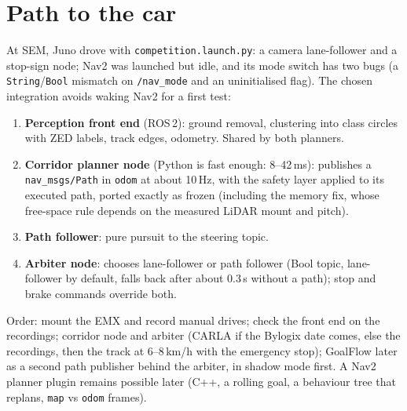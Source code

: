 \documentclass[11pt,a4paper]{article}
\newcommand{\code}[1]{\texttt{#1}}
\begin{document}
\section{Path to the car}
\label{sec:deploy}
At SEM, Juno drove with \code{competition.launch.py}: a camera lane-follower and a stop-sign node; Nav2 was launched
but idle, and its mode switch has two bugs (a \code{String}/\code{Bool} mismatch on \code{/nav\_mode} and an
uninitialised flag). The chosen integration avoids waking Nav2 for a first test:
\begin{enumerate}[nosep]
  \item \textbf{Perception front end} (ROS\,2): ground removal, clustering into class circles with ZED labels, track
        edges, odometry. Shared by both planners.
  \item \textbf{Corridor planner node} (Python is fast enough: 8--42\,ms): publishes a \code{nav\_msgs/Path} in
        \code{odom} at about 10\,Hz, with the safety layer applied to its executed path, ported exactly as frozen
        (including the memory fix, whose free-space rule depends on the measured LiDAR mount and pitch).
  \item \textbf{Path follower}: pure pursuit to the steering topic.
  \item \textbf{Arbiter node}: chooses lane-follower or path follower (Bool topic, lane-follower by default, falls back
        after about 0.3\,s without a path); stop and brake commands override both.
\end{enumerate}
Order: mount the EMX and record manual drives; check the front end on the recordings; corridor node and arbiter
(CARLA if the Bylogix date comes, else the recordings, then the track at 6--8\,km/h with the emergency stop);
GoalFlow later as a second path publisher behind the arbiter, in shadow mode first. A Nav2 planner plugin remains
possible later (C++, a rolling goal, a behaviour tree that replans, \code{map} vs \code{odom} frames).

\end{document}
